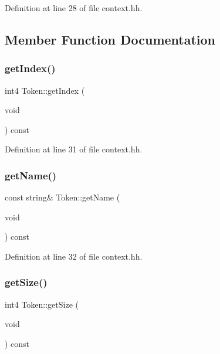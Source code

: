 Definition at line 28 of file context.\+hh.



\subsection{Member Function Documentation}
\mbox{\label{class_token_aff0c02f3e00144c7225b28649f23dbbd}} 
\subsubsection{\texorpdfstring{getIndex()}{getIndex()}}
{\footnotesize\ttfamily int4 Token\+::get\+Index (\begin{DoxyParamCaption}\item[{void}]{ }\end{DoxyParamCaption}) const\hspace{0.3cm}{\ttfamily [inline]}}



Definition at line 31 of file context.\+hh.

\mbox{\label{class_token_a58bc31cd9e0d154d081d160f6fb64569}} 
\subsubsection{\texorpdfstring{getName()}{getName()}}
{\footnotesize\ttfamily const string\& Token\+::get\+Name (\begin{DoxyParamCaption}\item[{void}]{ }\end{DoxyParamCaption}) const\hspace{0.3cm}{\ttfamily [inline]}}



Definition at line 32 of file context.\+hh.

\mbox{\label{class_token_a2151b6987a4821ecfbd527973de5219e}} 
\subsubsection{\texorpdfstring{getSize()}{getSize()}}
{\footnotesize\ttfamily int4 Token\+::get\+Size (\begin{DoxyParamCaption}\item[{void}]{ }\end{DoxyParamCaption}) const\hspace{0.3cm}{\ttfamily [inline]}}



